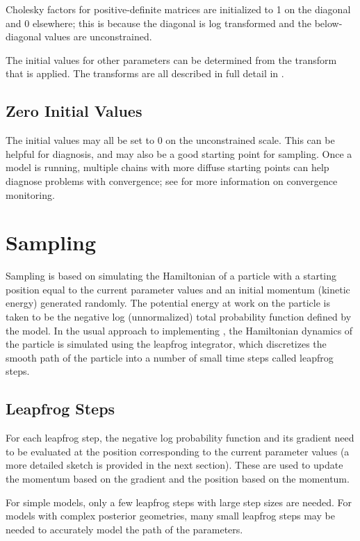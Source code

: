 Cholesky factors for positive-definite matrices are initialized to 1
on the diagonal and 0 elsewhere;  this is because the diagonal is log
transformed and the below-diagonal values are unconstrained.

The initial values for other parameters can be determined from the
transform that is applied.  The transforms are all described in full
detail in .

\subsection{Zero Initial Values}

The initial values may all be set to 0 on the unconstrained scale.
This can be helpful for diagnosis, and may also be a good starting
point for sampling.  Once a model is running, multiple chains with
more diffuse starting points can help diagnose problems with
convergence; see  for more information on
convergence monitoring.





\section{Sampling}

Sampling is based on simulating the Hamiltonian of a particle with a
starting position equal to the current parameter values and an initial
momentum (kinetic energy) generated randomly.  The potential energy at
work on the particle is taken to be the negative log (unnormalized) total
probability function defined by the model.  In the usual approach to
implementing \HMC, the Hamiltonian dynamics of the particle is
simulated using the leapfrog integrator, which discretizes the smooth
path of the particle into a number of small time steps called leapfrog
steps.

\subsection{Leapfrog Steps}

For each leapfrog step, the negative log probability function and its
gradient need to be evaluated at the position corresponding to the
current parameter values (a more detailed sketch is provided in the
next section).  These are used to update the momentum based on the
gradient and the position based on the momentum.

For simple models, only a few leapfrog steps with large step sizes are
needed.  For models with complex posterior geometries, many small
leapfrog steps may be needed to accurately model the path of the
parameters.

